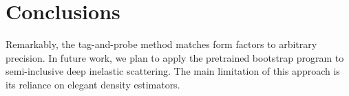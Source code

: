 \section{Conclusions}\label{sec:conclusions}

Remarkably, the tag-and-probe method matches form factors to arbitrary
precision. In future work, we plan to apply the pretrained bootstrap
program to semi-inclusive deep inelastic scattering. The main limitation
of this approach is its reliance on elegant density estimators.

